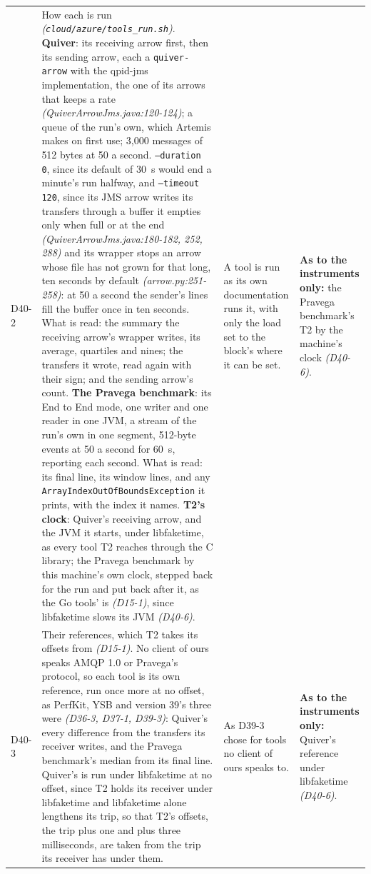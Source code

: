 \documentclass[11pt]{article}
\newcommand{\gl}[1]{{\color{soft}\itshape\small (#1)}}
\begin{document}
{\begin{longtable}{@{}p{1.1cm} >{\raggedright\arraybackslash}p{6.1cm} >{\raggedright\arraybackslash}p{6.0cm} >{\raggedright\arraybackslash}p{2.2cm}@{}}
D40-2 & How each is run \gl{\texttt{cloud/azure/tools\_run.sh}}. \textbf{Quiver}: its receiving arrow first, then its sending arrow, each a \texttt{quiver-arrow} with the qpid-jms implementation, the one of its arrows that keeps a rate \gl{QuiverArrowJms.java:120-124}; a queue of the run's own, which Artemis makes on first use; 3,000 messages of 512 bytes at 50 a second. \texttt{--duration 0}, since its default of 30~s would end a minute's run halfway, and \texttt{--timeout 120}, since its JMS arrow writes its transfers through a buffer it empties only when full or at the end \gl{QuiverArrowJms.java:180-182, 252, 288} and its wrapper stops an arrow whose file has not grown for that long, ten seconds by default \gl{arrow.py:251-258}: at 50 a second the sender's lines fill the buffer once in ten seconds. What is read: the summary the receiving arrow's wrapper writes, its average, quartiles and nines; the transfers it wrote, read again with their sign; and the sending arrow's count. \textbf{The Pravega benchmark}: its End to End mode, one writer and one reader in one JVM, a stream of the run's own in one segment, 512-byte events at 50 a second for 60~s, reporting each second. What is read: its final line, its window lines, and any \texttt{ArrayIndexOutOfBoundsException} it prints, with the index it names. \textbf{T2's clock}: Quiver's receiving arrow, and the JVM it starts, under libfaketime, as every tool T2 reaches through the C library; the Pravega benchmark by this machine's own clock, stepped back for the run and put back after it, as the Go tools' is \gl{D15-1}, since libfaketime slows its JVM \gl{D40-6}. & A tool is run as its own documentation runs it, with only the load set to the block's where it can be set. & \textbf{As to the instruments only:} the Pravega benchmark's T2 by the machine's clock \gl{D40-6}. \\
D40-3 & Their references, which T2 takes its offsets from \gl{D15-1}. No client of ours speaks AMQP 1.0 or Pravega's protocol, so each tool is its own reference, run once more at no offset, as PerfKit, YSB and version 39's three were \gl{D36-3, D37-1, D39-3}: Quiver's every difference from the transfers its receiver writes, and the Pravega benchmark's median from its final line. Quiver's is run under libfaketime at no offset, since T2 holds its receiver under libfaketime and libfaketime alone lengthens its trip, so that T2's offsets, the trip plus one and plus three milliseconds, are taken from the trip its receiver has under them. & As D39-3 chose for tools no client of ours speaks to. & \textbf{As to the instruments only:} Quiver's reference under libfaketime \gl{D40-6}. \\

\end{longtable}}
\end{document}
